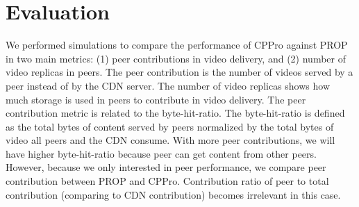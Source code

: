 \documentclass[10pt,final,journal,a4paper]{IEEEtran}
\begin{document}

\section{Evaluation}\label{evaluation}

We performed simulations to compare the performance of CPPro against PROP in two main metrics: (1) peer contributions in video delivery, and (2) number of video replicas in peers.
The peer contribution is the number of videos served by a peer instead of by the CDN server.
The number of video replicas shows how much storage is used in peers to contribute in video delivery.
The peer contribution metric is related to the byte-hit-ratio. 
The byte-hit-ratio is defined as the total bytes of content served by peers normalized by the total bytes of video all peers and the CDN consume.
With more peer contributions, we will have higher byte-hit-ratio because peer can get content from other peers. 
However, because we only interested in peer performance, we compare peer contribution between PROP and CPPro.
Contribution ratio of peer to total contribution (comparing to CDN contribution) becomes irrelevant in this case.

\end{document}
